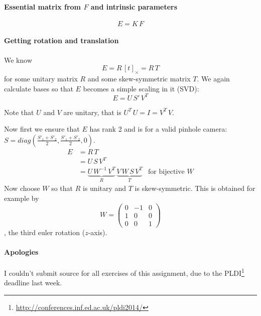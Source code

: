 \documentclass{paper}
\begin{document}
\paragraph{Essential matrix from $F$ and intrinsic parameters}
\[E = K\, F\]
\paragraph{Getting rotation and translation}
We know
\[ E = R\,[t]_\times = R\, T\]
for some unitary matrix $R$ and some skew-symmetric matrix $T$. We again 
calculate bases so that $E$ becomes a simple scaling in it (SVD):
\[ E = U \, S'\, V^T\]

Note that $U$ and $V$ are unitary, that is $U^T\,U = I = V^T\, V$.

Now first we ensure that $E$ has rank 2 and is for a valid pinhole camera:
$S = diag(\frac{S'_1 +S'_2}{2}, \frac{S'_1 +S'_2}{2}, 0)$.
\begin{align*}
	E 	&=  R\, T \\
	 	&= U\, S\, V^T\\
	 	&= \underbrace{U\, W^{-1}\, V^T}_{R}\, \underbrace{V\, W\, S\, V^T}_{T} &\text{for bijective } W
\end{align*}
Now choose $W$ so that $R$ is unitary and $T$ is skew-symmetric. This is obtained for example by
\[ W =\begin{pmatrix}
0 & -1 &0\\
1& 0&0\\
0&0&1
\end{pmatrix} \]
, the third euler rotation ($z$-axis).

\paragraph{Apologies}
I couldn't submit source for all exercises of this assignment, due to the PLDI\footnote{\url{http://conferences.inf.ed.ac.uk/pldi2014/}} deadline last week.
\end{document}
